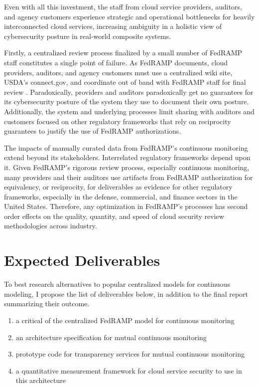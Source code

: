 \documentclass{jdf}
\begin{document}
Even with all this investment, the staff from cloud service providers, auditors, and agency customers experience strategic and operational bottlenecks for heavily interconnected cloud services, increasing ambiguity in a holistic view of cybersecurity posture in real-world composite systems. 

Firstly, a centralized review process finalized by a small number of FedRAMP staff constitutes a single point of failure. As FedRAMP documents, cloud providers, auditors, and agency customers must use a centralized wiki site, USDA's connect.gov, and coordinate out of band with FedRAMP staff for final review \citeyear[pp.~3,14]{fedramp_auth_playbook25}. Paradoxically, providers and auditors paradoxically get no guarantees for its cybersecurity posture of the system they use to document their own posture. Additionally, the system and underlying processes limit sharing with auditors and customers focused on other regulatory frameworks that rely on reciprocity guarantees to justify the use of FedRAMP authorizations.

The impacts of manually curated data from FedRAMP's continuous monitoring extend beyond its stakeholders. Interrelated regulatory frameworks depend upon it. Given FedRAMP's rigorous review process, especially continuous monitoring, many providers and their auditors use artifacts from FedRAMP authorization for equivalency, or reciprocity, for deliverables as evidence for other regulatory frameworks, especially in the defense, commercial, and finance sectors in the United States. Therefore, any optimization in FedRAMP's processes has second order effects on the quality, quantity, and speed of cloud security review methodologies across industry.

\section{Expected Deliverables}

To best research alternatives to popular centralized models for continuous modeling, I propose the list of deliverables below, in addition to the final report summarizing their outcome. 

\begin{enumerate}
    \item a critical of the centralized FedRAMP model for continuous monitoring
    \item an architecture specification for mutual continuous monitoring
    \item prototype code for transparency services for mutual continuous monitoring
    \item a quantitative measurement framework for cloud service security to use in this architecture
\end{enumerate}



\end{document}
